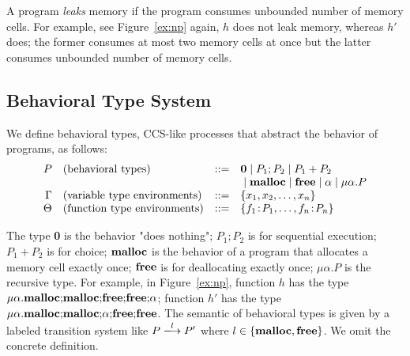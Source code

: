 \documentclass{sigplanconf}
\begin{document}

A program \emph{leaks} memory if the program consumes unbounded number
of memory cells.  For example, see Figure~\ref{ex:np} again, \(h\)
does not leak memory, whereas \(h'\) does; the former
consumes at most two memory cells at once but the latter consumes
unbounded number of memory cells.

\subsection{Behavioral Type System}
 We define behavioral types, CCS-like processes that abstract the
 behavior of programs, as follows:
\[
\begin{array}{rlcl}
  P & (\mbox{behavioral types})&::=& {\bf 0} \;|\; P_{1};P_{2} \;|\; P_{1}+P_{2} \\
     & & & \;|\; \mathbf{malloc} \;|\; \mathbf{free} \;|\; \alpha \;|\; \mu\alpha.P \\
  \Gamma & (\mbox{variable type environments}) &::=& \{x_1, x_2, \dots, x_n\}\\
  \Theta & (\mbox{function type environments}) &::=& \{f_1\!:\! P_1,\dots,f_n\!:\! P_n\}\\
\end{array}
\]

The type {\bf 0} is the behavior "does nothing"; $P_{1};P_{2}$ is for
sequential execution; $P_{1}+P_{2}$ is for choice; $\mathbf{malloc}$ is the
behavior of a program that allocates a memory cell exactly once;
$\mathbf{free}$ is for deallocating exactly once; $\mu\alpha.P$ is the
recursive type. For example, in Figure~\ref{ex:np}, function \(h\) has
the type
\(\mu\alpha.\mathbf{malloc};\!\mathbf{malloc};\!\mathbf{free};\!\mathbf{free};\!\alpha\);
function \(h'\) has the type
\(\mu\alpha.\mathbf{malloc};\!\mathbf{malloc};\!\alpha;\!\mathbf{free};\!\mathbf{free}\).  The
semantic of behavioral types is given by a labeled transition system
like \(P\xlongrightarrow{l} P'\) where \(l \in \{\mathbf{malloc}, \mathbf{free}\}\). We
omit the concrete definition.
\end{document}
